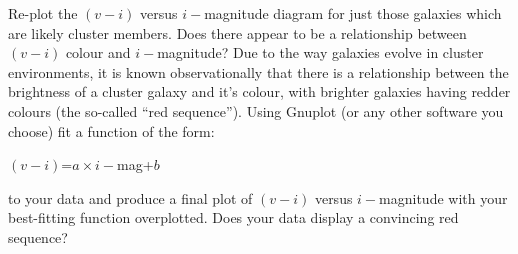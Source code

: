 Re-plot the $(v-i)$ versus $i-$magnitude diagram for just those galaxies which
are likely cluster members. Does there appear to be a relationship
between $(v-i)$ colour and $i-$magnitude? Due to the way galaxies
evolve in cluster environments, it is known observationally
that there is a relationship between the brightness of a cluster
galaxy and it's colour, with brighter galaxies having redder colours
(the so-called ``red sequence''). Using Gnuplot (or any other software you choose) fit a
function of the form:\\
\begin{center}
$(v-i)$=$a\times i-$mag+$b$ 
\end{center}
\noindent
to your data and produce a final plot of $(v-i)$ versus $i-$magnitude with your
best-fitting function overplotted. Does your data display a convincing
red sequence?
